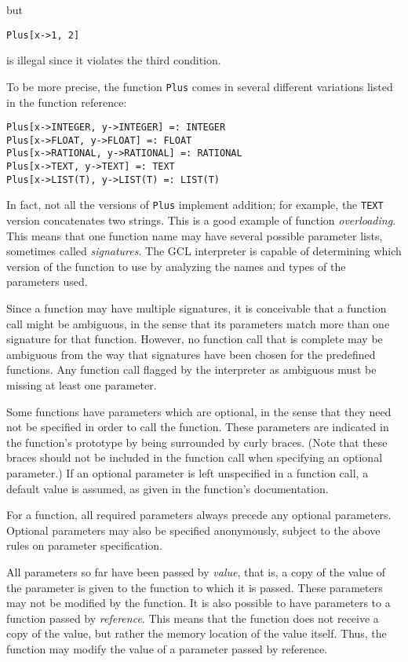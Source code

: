 \noindent but

\begin{verbatim}
Plus[x->1, 2]
\end{verbatim}

\noindent is illegal since it violates the third condition.

To be more precise, the function {\tt Plus} comes in several different
variations listed in the function reference:

\begin{verbatim}
Plus[x->INTEGER, y->INTEGER] =: INTEGER
Plus[x->FLOAT, y->FLOAT] =: FLOAT
Plus[x->RATIONAL, y->RATIONAL] =: RATIONAL
Plus[x->TEXT, y->TEXT] =: TEXT
Plus[x->LIST(T), y->LIST(T) =: LIST(T)
\end{verbatim}

\noindent In fact, not all the versions of {\tt Plus} implement addition;
for example, the {\tt TEXT} version concatenates two strings.  This is a
good example of function {\it overloading}.  This means that one function
name may have several possible parameter lists, sometimes called
{\it signatures}.  The GCL interpreter is capable of determining which
version of the function to use by analyzing the names and types of the
parameters used.

Since a function may have multiple signatures, it is conceivable that
a function call might be ambiguous, in the sense that its parameters match
more than one signature for that function.  However, no function call that
is complete may be ambiguous from the way that signatures have been
chosen for the predefined functions.  Any function call flagged by the
interpreter as ambiguous must be missing at least one parameter.

Some functions have parameters which are optional, in the sense that they
need not be specified in order to call the function.  These parameters
are indicated in the function's prototype by being surrounded by curly
braces.  (Note that these braces should not be included in the function
call when specifying an optional parameter.)  If an optional parameter
is left unspecified in a function call, a default value is assumed, as
given in the function's documentation.

For a function, all required parameters always precede any optional
parameters.  Optional parameters may also be specified anonymously,
subject to the above rules on parameter specification.

All parameters so far have been passed by {\it value}, that is, a copy
of the value of the parameter is given to the function to which it is passed.
These parameters may not be modified by the function.  It is also possible
to have parameters to a function passed by {\it reference}.  This means
that the function does not receive a copy of the value, but rather the
memory location of the value itself.  Thus, the function may modify
the value of a parameter passed by reference.

